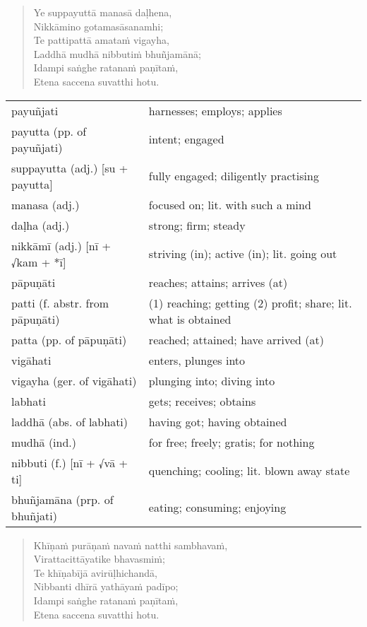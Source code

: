 \documentclass[11pt,oneside]{memoir}
\begin{document}
\clearpage

\begin{quote}
Ye suppayuttā manasā daḷhena, \\[0pt]
Nikkāmino gotamasāsanamhi; \\[0pt]
Te pattipattā amataṁ vigayha, \\[0pt]
Laddhā mudhā nibbutiṁ bhuñjamānā; \\[0pt]
Idampi saṅghe ratanaṁ paṇītaṁ, \\[0pt]
Etena saccena suvatthi hotu.
\end{quote}

\begin{longtable}{L{\colOne} L{\colTwo}}
payuñjati & harnesses; employs; applies\\[0pt]
payutta (pp. of payuñjati) & intent; engaged\\[0pt]
suppayutta (adj.) [su + payutta] & fully engaged; diligently practising\\[0pt]
manasa (adj.) & focused on; lit. with such a mind\\[0pt]
daḷha (adj.) & strong; firm; steady\\[0pt]
nikkāmī (adj.) [nī + √kam + *ī] & striving (in); active (in); lit. going out\\[0pt]
pāpuṇāti & reaches; attains; arrives (at)\\[0pt]
patti (f. abstr. from pāpuṇāti) & (1) reaching; getting (2) profit; share; lit. what is obtained\\[0pt]
patta (pp. of pāpuṇāti) & reached; attained; have arrived (at)\\[0pt]
vigāhati & enters, plunges into\\[0pt]
vigayha (ger. of vigāhati) & plunging into; diving into\\[0pt]
labhati & gets; receives; obtains\\[0pt]
laddhā (abs. of labhati) & having got; having obtained\\[0pt]
mudhā (ind.) & for free; freely; gratis; for nothing\\[0pt]
nibbuti (f.) [nī + √vā + ti] & quenching; cooling; lit. blown away state\\[0pt]
bhuñjamāna (prp. of bhuñjati) & eating; consuming; enjoying\\[0pt]
\end{longtable}

\clearpage

\begin{quote}
Khīṇaṁ purāṇaṁ navaṁ natthi sambhavaṁ, \\[0pt]
Virattacittāyatike bhavasmiṁ; \\[0pt]
Te khīṇabījā avirūḷhichandā, \\[0pt]
Nibbanti dhīrā yathāyaṁ padīpo; \\[0pt]
Idampi saṅghe ratanaṁ paṇītaṁ, \\[0pt]
Etena saccena suvatthi hotu.
\end{quote}
\end{document}
